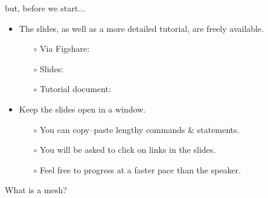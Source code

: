 \documentclass[t]{beamer}
\begin{document}
\begin{frame}{but, before we start...}
  \begin{itemize}
     \item The slides, as well as a more detailed tutorial, are freely available.\\
     \begin{itemize}
         \item[$\circ$] Via Figshare:
         \item[$\circ$] Slides:
         \item[$\circ$] Tutorial document:
     \end{itemize}
     \item Keep the slides open in a window.
     \begin{itemize}
         \item[$\circ$] You can copy--paste lengthy commands \& statements.
         \item[$\circ$] You will be asked to click on links in the slides.
         \item[$\circ$] Feel free to progress at a faster pace than the speaker.
     \end{itemize}
  \end{itemize}
\end{frame}

\begin{frame}{What is a mesh?}
\end{frame}
\end{document}

